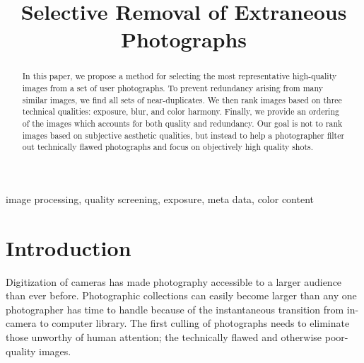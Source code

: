 \documentclass{article}
\begin{document}
\sloppy

\title{
Selective Removal of Extraneous Photographs
}

\address{[ksamii,acarlisl]@ucsc.edu,[uliana,davis]@soe.ucsc.edu}

\maketitle	
\begin{abstract}
In this paper, we propose a method for selecting the most representative high-quality images from a set of user photographs. To prevent redundancy arising from many similar images, we find all sets of near-duplicates. We then rank images based on three technical qualities: exposure, blur, and color harmony. Finally, we provide an ordering of the images which accounts for both quality and redundancy. Our goal is not to rank images based on subjective aesthetic qualities, but instead to help a photographer filter out technically flawed photographs and focus on objectively high quality shots.
\end{abstract}	

\begin{keywords}
image processing, quality screening, exposure, meta data, color content  %
\end{keywords}

\section{Introduction}

Digitization of cameras has made photography accessible to a larger audience than ever before.  Photographic collections can easily become larger than any one photographer has time to handle because of the instantaneous transition from in-camera to computer library.  The first culling of photographs needs to eliminate those unworthy of human attention; the technically flawed and otherwise poor-quality images.
\end{document}
